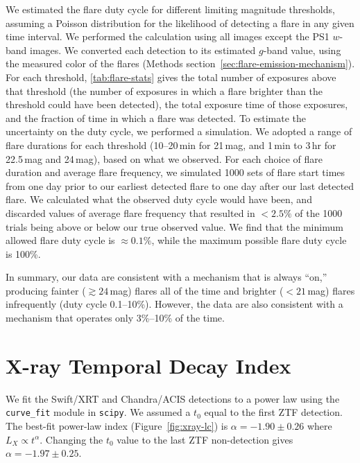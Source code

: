 \documentclass{nature_plusfigure}
\begin{document}
\begin{methods}
We estimated the flare duty cycle for different limiting magnitude thresholds, assuming a Poisson distribution for the likelihood of detecting a flare in any given time interval. We performed the calculation using all images except the PS1 $w$-band images.
We converted each detection to its estimated $g$-band value, using the measured color of the flares (Methods section~\ref{sec:flare-emission-mechanism}). 
For each threshold, \ref{tab:flare-stats} gives the total number of exposures above that threshold (the number of exposures in which a flare brighter than the threshold could have been detected), the total exposure time of those exposures, and the fraction of time in which a flare was detected. To estimate the uncertainty on the duty cycle, we performed a simulation. We adopted a range of flare durations for each threshold (10--20\,min for 21\,mag, and 1\,min to 3\,hr for 22.5\,mag and 24\,mag), based on what we observed. For each choice of flare duration and average flare frequency, we simulated 1000 sets of flare start times from one day prior to our earliest detected flare to one day after our last detected flare. We calculated what the observed duty cycle would have been, and discarded values of average flare frequency that resulted in $<2.5\%$ of the 1000 trials being above or below our true observed value. We find that the minimum allowed flare duty cycle is $\approx0.1\%$, while the maximum possible flare duty cycle is 100\%.

In summary, our data are consistent with a mechanism that is always ``on,'' producing fainter ($\gtrsim24$\,mag) flares all of the time and brighter ($<21\,$mag) flares infrequently (duty cycle 0.1--10\%). However, the data are also consistent with a mechanism that operates only 3\%--10\% of the time. 


\section{X-ray Temporal Decay Index}
\label{sec:xray-decay-index}

We fit the Swift/XRT and Chandra/ACIS detections to a power law using the \texttt{curve\_fit} module in \texttt{scipy}. We assumed a $t_0$ equal to the first ZTF detection. The best-fit power-law index (Figure~\ref{fig:xray-lc}) is $\alpha=-1.90\pm0.26$ where $L_X \propto t^{\alpha}$.
Changing the $t_0$ value to the last ZTF non-detection gives $\alpha=-1.97\pm0.25$.


\end{methods}
\end{document}
